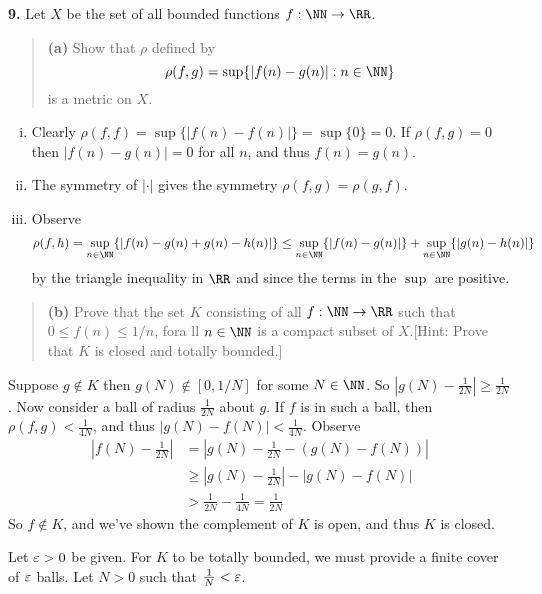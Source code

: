 \documentclass{homework}
\begin{document}
{\bf 9.} Let $X$ be the set of all bounded functions $f:\NN\to \RR$.  
\begin{quote}
  {\bf (a)} Show that $\rho$ defined by 
  $$
    \rho(f,g) = \sup\{|f(n) - g(n)|:n\in\NN\}
  $$
  is a metric on $X$.
\end{quote}
\begin{solution}
\begin{enumerate}[i)]
  \item Clearly $\rho(f,f) = \sup\{|f(n) - f(n)|\} = \sup\{0\} = 0$.  If $\rho(f,g) = 0$ then $|f(n) - g(n)| = 0$ for all $n$, and thus $f(n) = g(n)$.
  \item The symmetry of $|\cdot|$ gives the symmetry $\rho(f,g) = \rho(g,f)$.
  \item Observe
  $$
    \rho(f,h) = \sup_{n\in\NN}\{|f(n) - g(n) + g(n) - h(n)|\} \le \sup_{n\in\NN}\{|f(n) - g(n)|\} + \sup_{n\in\NN}\{|g(n) - h(n)|\}
  $$
  by the triangle inequality in $\RR$ and since the terms in the $\sup$ are positive.
\end{enumerate}
\end{solution}
\begin{quote}
  {\bf (b)} Prove that the set $K$ consisting of all $f:\NN\to \RR$ such that $0\le f(n)\le1/n$, fora ll $n\in\NN$ is a compact subset of $X$.[Hint: Prove that $K$ is closed and totally bounded.]
\end{quote}
\begin{solution}
  Suppose $g\not\in K$ then $g(N) \not\in [0,1/N]$ for some $N\in\NN$. So $|g(N) - \frac 1{2N}|\ge \frac 1{2N}$.  Now consider a ball of radius $\frac 1{2N}$ about $g$. If $f$ is in such a ball, then $\rho(f,g) < \frac 1{4N}$, and thus $|g(N) - f(N)| < \frac 1{4N}$.  Observe
  \begin{align*}
    \left|f(N) - \frac 1{2N}\right| 
    &= \left|g(N) - \frac{1}{2N} - \left(g(N)-f(N)\right)\right| \\
    &\ge |g(N) - \frac{1}{2N}| - \left|g(N) - f(N)\right|\\
    &> \frac 1{2N} - \frac 1{4N}  = \frac 1{2N}
  \end{align*}
  So $f \not\in K$, and we've shown the complement of $K$ is open, and thus $K$ is closed. 
  
  Let $\varepsilon > 0$ be given. For $K$ to be totally bounded, we must provide a finite cover of $\varepsilon$ balls. Let $N>0$ such that $\frac 1N < \varepsilon$.
\end{solution}
\end{document}
